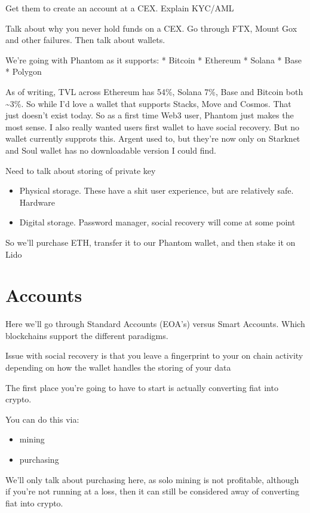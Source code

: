 \documentclass[
  letterpaper,
  DIV=11,
  numbers=noendperiod]{scrreprt}
\providecommand{\tightlist}{%
  \setlength{\itemsep}{0pt}\setlength{\parskip}{0pt}}\usepackage{longtable,booktabs,array}
\begin{document}
Get them to create an account at a CEX. Explain KYC/AML

Talk about why you never hold funds on a CEX. Go through FTX, Mount Gox
and other failures. Then talk about wallets.

We're going with Phantom as it supports: * Bitcoin * Ethereum * Solana *
Base * Polygon

As of writing, TVL across Ethereum has 54\%, Solana 7\%, Base and
Bitcoin both \textasciitilde3\%. So while I'd love a wallet that
supports Stacks, Move and Cosmos. That just doesn't exist today. So as a
first time Web3 user, Phantom just makes the most sense. I also really
wanted users first wallet to have social recovery. But no wallet
currently supprots this. Argent used to, but they're now only on
Starknet and Soul wallet has no downloadable version I could find.

Need to talk about storing of private key

\begin{itemize}
\tightlist
\item
  Physical storage. These have a shit user experience, but are
  relatively safe. Hardware
\item
  Digital storage. Password manager, social recovery will come at some
  point
\end{itemize}

So we'll purchase ETH, transfer it to our Phantom wallet, and then stake
it on Lido

\section{Accounts}\label{accounts-1}

Here we'll go through Standard Accounts (EOA's) versus Smart Accounts.
Which blockchains support the different paradigms.

Issue with social recovery is that you leave a fingerprint to your on
chain activity depending on how the wallet handles the storing of your
data

The first place you're going to have to start is actually converting
fiat into crypto.

You can do this via:

\begin{itemize}
\tightlist
\item
  mining
\item
  purchasing
\end{itemize}

We'll only talk about purchasing here, as solo mining is not profitable,
although if you're not running at a loss, then it can still be
considered away of converting fiat into crypto.
\end{document}
